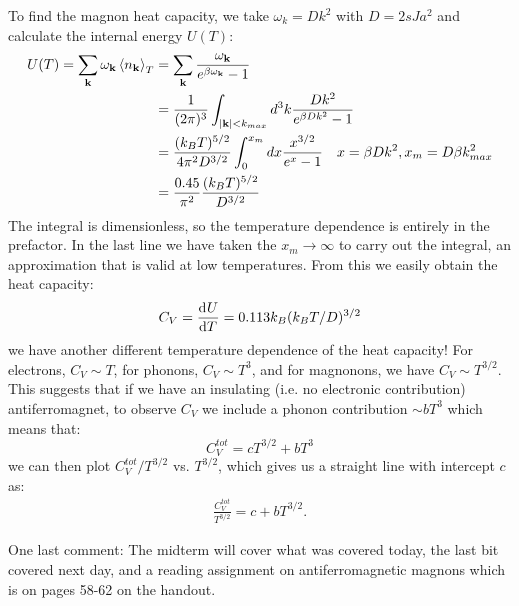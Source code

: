 To find the magnon heat capacity, we take $\omega_k = Dk^2$ with $D = 2sJa^2$ and calculate the internal energy $U(T)$:
\begin{equation}
    \begin{split}
        U(T) = \sum_{\mathbf{k}}\omega_{\mathbf{k}}\left< n_{\mathbf{k}} \right>_T &= \sum_{\mathbf{k}}\frac{\omega_{\mathbf{k}}}{e^{\beta\omega_{\mathbf{k}}} - 1}
        \\ &= \frac{1}{(2\pi)^3}\int_{\lvert \mathbf{k} \rvert < k_{max}} d^3k \frac{Dk^2}{e^{\beta Dk^2} - 1}
        \\ &= \frac{(k_B T)^{5/2}}{4\pi^2 D^{3/2}}\int_0^{x_m}dx \frac{x^{3/2}}{e^x - 1} \quad x = \beta Dk^2, x_m = D\beta k^2_{max}
        \\ &= \frac{0.45}{\pi^2}\frac{(k_B T)^{5/2}}{D^{3/2}}
    \end{split}
\end{equation}
The integral is dimensionless, so the temperature dependence is entirely in the prefactor. In the last line we have taken the $x_m \to \infty$ to carry out the integral, an approximation that is valid at low temperatures. From this we easily obtain the heat capacity:
\begin{equation}
    C_V = \dod{U}{T} = 0.113k_B(k_B T/D)^{3/2}
\end{equation}
we have another different temperature dependence of the heat capacity! For electrons, $C_V \sim T$, for phonons, $C_V \sim T^3$, and for magnonons, we have $C_V \sim T^{3/2}$. This suggests that if we have an insulating (i.e. no electronic contribution) antiferromagnet, to observe $C_V$ we include a phonon contribution $\sim bT^3$ which means that:
\begin{equation}
    C_V^{tot} = cT^{3/2} + bT^3
\end{equation}
we can then plot $C_V^{tot}/T^{3/2}$ vs. $T^{3/2}$, which gives us a straight line with intercept $c$ as:
\begin{align*}
    \frac{C_V^{tot}}{T^{3/2}} = c + bT^{3/2}.
\end{align*}

One last comment: The midterm will cover what was covered today, the last bit covered next day, and a reading assignment on antiferromagnetic magnons which is on pages 58-62 on the handout.
